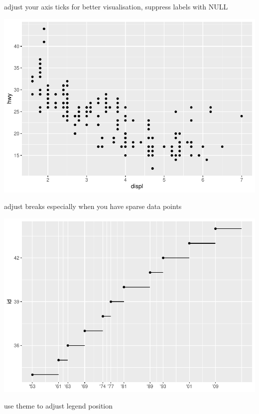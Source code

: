 \documentclass[
]{article}
\begin{document}
adjust your axis ticks for better visualisation, suppress labels with
NULL

\includegraphics{rmarkdown_tutorial_files/figure-latex/unnamed-chunk-20-1.pdf}

adjust breaks especially when you have sparse data points

\includegraphics{rmarkdown_tutorial_files/figure-latex/unnamed-chunk-21-1.pdf}

use theme to adjust legend position
\end{document}
